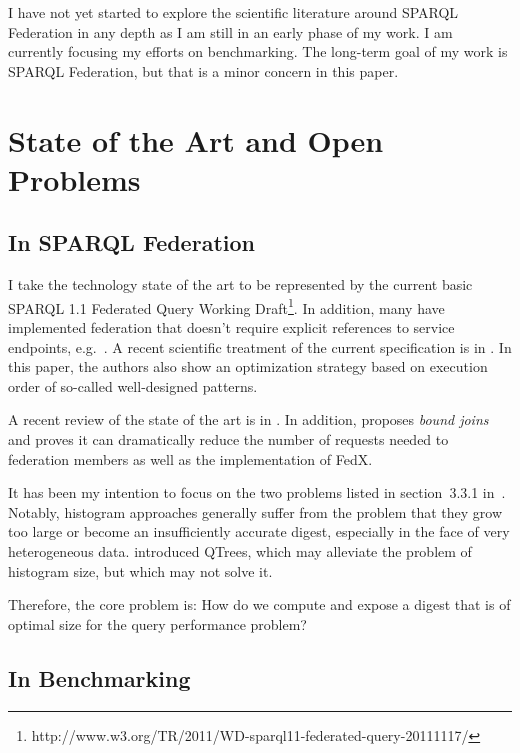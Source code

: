 \documentclass{llncs}
\begin{document}
I have not yet started to explore the scientific literature around
SPARQL Federation in any depth as I am still in an early phase of my
work. I am currently focusing my efforts on benchmarking. The
long-term goal of my work is SPARQL Federation, but that is a minor
concern in this paper.

\section{State of the Art and Open Problems}

\subsection{In SPARQL Federation}

I take the technology state of the art to be represented by the
current basic SPARQL 1.1 Federated Query Working
Draft\footnote{http://www.w3.org/TR/2011/WD-sparql11-federated-query-20111117/}. In
addition, many have implemented federation that doesn't require 
explicit references to service endpoints, e.g.~\cite{springerlink:10.1007/978-3-642-25073-6-38}.
A recent scientific treatment of the current specification is in
\cite{springerlink:10.1007/978-3-642-21064-8-1}. In this paper, the
authors also show an optimization strategy based on execution order of
so-called well-designed patterns.

A recent review of the state of the art is in
\cite{springerlink:10.1007/978-3-642-17551-0-5}. In addition,
\cite{springerlink:10.1007/978-3-642-25073-6-38} proposes
\emph{bound joins} and proves it can dramatically reduce the number of
requests needed to federation members as well as the implementation of
FedX.

It has been my intention to focus on the two problems listed in
section~3.3.1
in~\cite{springerlink:10.1007/978-3-642-17551-0-5}. Notably, histogram
approaches generally suffer from the problem that they grow too large
or become an insufficiently accurate digest, especially in the face of
very heterogeneous data.  \cite{Harth:2010:DSO:1772690.1772733}
introduced QTrees, which may alleviate the problem of histogram size,
but which may not solve it.

Therefore, the core problem is: How do we compute and expose a digest that
is of optimal size for the query performance problem?

\subsection{In Benchmarking}
\end{document}
